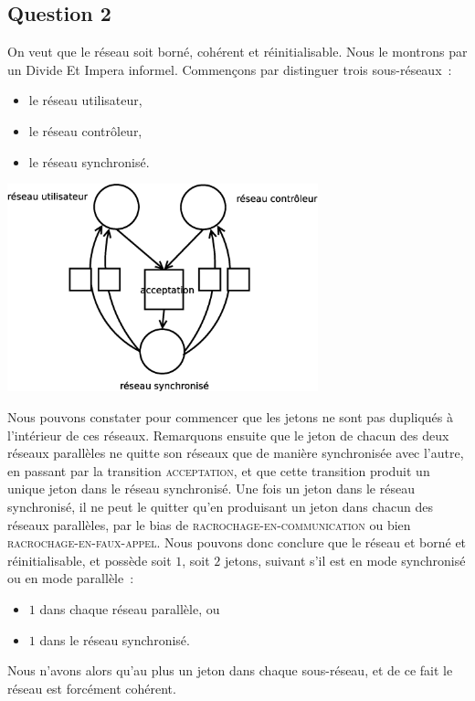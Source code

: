 \subsection*{Question 2}

On veut que le réseau soit borné, cohérent et réinitialisable. Nous le
montrons par un Divide Et Impera informel. Commençons par distinguer
trois sous-réseaux~:
\begin{itemize}
\item le réseau utilisateur,
\item le réseau contrôleur,
\item le réseau synchronisé.
\end{itemize}

\begin{center}
\includegraphics[width=9cm]{schemaexo2.eps}
\end{center}


Nous pouvons constater pour commencer que les jetons ne sont pas
dupliqués à l'intérieur de ces réseaux. Remarquons ensuite que le
jeton de chacun des deux réseaux parallèles ne quitte son réseaux
que de manière synchronisée avec l'autre, en passant par la transition
\textsc{acceptation}, et que cette transition produit un unique jeton
dans le réseau synchronisé.
Une fois un jeton dans le réseau synchronisé, il ne peut le quitter
qu'en produisant un jeton dans chacun des réseaux parallèles, par le
bias de \textsc{racrochage-en-communication} ou bien
\textsc{racrochage-en-faux-appel}.
Nous pouvons donc conclure que le réseau et borné et réinitialisable,
et possède soit $1$, soit $2$ jetons, suivant s'il est en mode synchronisé ou en mode parallèle~:
\begin{itemize}
\item $1$ dans chaque réseau parallèle, ou 
\item $1$ dans le réseau synchronisé.
\end{itemize} 
Nous n'avons alors qu'au plus un jeton dans chaque sous-réseau, et de
ce fait le réseau est forcément cohérent.

